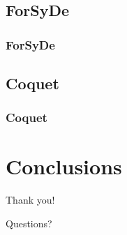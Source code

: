 \documentclass{beamer}
\begin{document}
        \subsection{ForSyDe}
        \label{subsec:forsyde}
            \begin{frame}
                \frametitle{ForSyDe}
            \end{frame}

        \subsection{Coquet}
        \label{subsec:coquet}
            \begin{frame}
                \frametitle{Coquet}
            \end{frame}


    \section{Conclusions}
    \label{sec:conclusions}
        \frame{\sectionpage}

        \begin{frame}[plain]
            \begin{center}
                \par{\Huge{Thank you!}}
                \vspace{2.0cm}
                \par{\Huge{Questions?}}
            \end{center}
        \end{frame}
\end{document}
